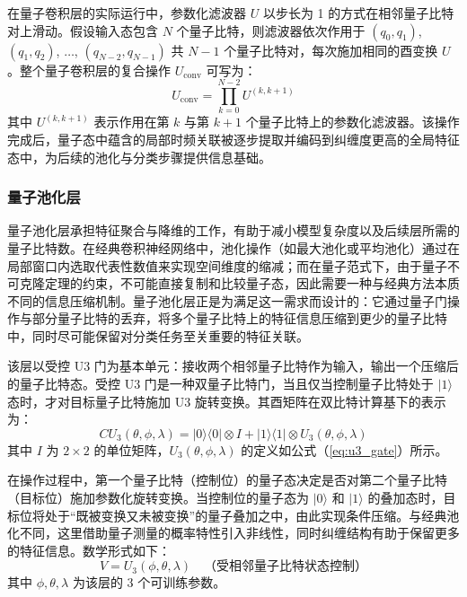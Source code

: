 在量子卷积层的实际运行中，参数化滤波器 $U$ 以步长为 1 的方式在相邻量子比特对上滑动。假设输入态包含 $N$ 个量子比特，则滤波器依次作用于
$(q_0, q_1)$, $(q_1, q_2)$, $\ldots$, $(q_{N-2}, q_{N-1})$
共 $N-1$ 个量子比特对，每次施加相同的酉变换 $U$。整个量子卷积层的复合操作 $U_{\text{conv}}$ 可写为：
\begin{equation}
	U_{\text{conv}} = \prod_{k=0}^{N-2} U^{(k, k+1)}
	\label{eq:q_conv_total}
\end{equation}
其中 $U^{(k, k+1)}$ 表示作用在第 $k$ 与第 $k+1$ 个量子比特上的参数化滤波器。该操作完成后，量子态中蕴含的局部时频关联被逐步提取并编码到纠缠度更高的全局特征态中，为后续的池化与分类步骤提供信息基础。

\subsubsection{量子池化层}
\label{subsec:q_pool}

量子池化层承担特征聚合与降维的工作，有助于减小模型复杂度以及后续层所需的量子比特数。在经典卷积神经网络中，池化操作（如最大池化或平均池化）通过在局部窗口内选取代表性数值来实现空间维度的缩减；而在量子范式下，由于量子不可克隆定理的约束，不可能直接复制和比较量子态，因此需要一种与经典方法本质不同的信息压缩机制。量子池化层正是为满足这一需求而设计的：它通过量子门操作与部分量子比特的丢弃，将多个量子比特上的特征信息压缩到更少的量子比特中，同时尽可能保留对分类任务至关重要的特征关联。

该层以受控 U3 门为基本单元：接收两个相邻量子比特作为输入，输出一个压缩后的量子比特态。受控 U3 门是一种双量子比特门，当且仅当控制量子比特处于 $|1\rangle$ 态时，才对目标量子比特施加 U3 旋转变换。其酉矩阵在双比特计算基下的表示为：
\begin{equation}
	CU_3(\theta, \phi, \lambda) = |0\rangle\langle 0| \otimes I + |1\rangle\langle 1| \otimes U_3(\theta, \phi, \lambda)
	\label{eq:cu3_gate}
\end{equation}
其中 $I$ 为 $2 \times 2$ 的单位矩阵，$U_3(\theta, \phi, \lambda)$ 的定义如公式（\ref{eq:u3_gate}）所示。

在操作过程中，第一个量子比特（控制位）的量子态决定是否对第二个量子比特（目标位）施加参数化旋转变换。当控制位的量子态为 $|0\rangle$ 和 $|1\rangle$ 的叠加态时，目标位将处于“既被变换又未被变换”的量子叠加之中，由此实现条件压缩。与经典池化不同，这里借助量子测量的概率特性引入非线性，同时纠缠结构有助于保留更多的特征信息。数学形式如下：
\begin{equation}
	V = U_3(\phi, \theta, \lambda) \quad \text{（受相邻量子比特状态控制）}
	\label{eq:q_pool}
\end{equation}
其中 $\phi, \theta, \lambda$ 为该层的 3 个可训练参数。

